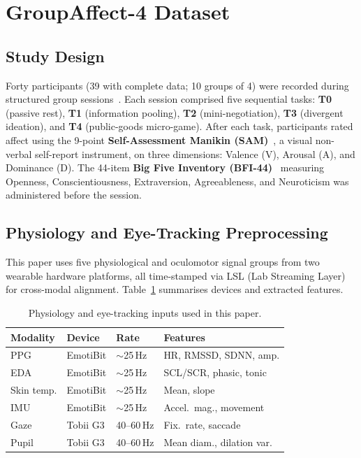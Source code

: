 \documentclass[sigconf,review,anonymous]{acmart}
\begin{document}
\section{GroupAffect-4 Dataset}
\label{sec:dataset}

\subsection{Study Design}
Forty participants (39 with complete data; 10 groups of 4) were recorded
during structured group sessions~\cite{groupaffect4}.
Each session comprised five sequential tasks:
\textbf{T0} (passive rest), \textbf{T1} (information pooling),
\textbf{T2} (mini-negotiation), \textbf{T3} (divergent ideation),
and \textbf{T4} (public-goods micro-game).
After each task, participants rated affect using the 9-point
\textbf{Self-Assessment Manikin (SAM)}~\cite{bradley1994sam}, a visual
non-verbal self-report instrument, on three dimensions: Valence (V),
Arousal (A), and Dominance (D).
The 44-item \textbf{Big Five Inventory (BFI-44)}~\cite{john1999bigfive}
measuring Openness, Conscientiousness, Extraversion, Agreeableness, and
Neuroticism was administered before the session.

\subsection{Physiology and Eye-Tracking Preprocessing}
\label{sec:modpreproc}

This paper uses five physiological and oculomotor signal groups from two
wearable hardware platforms, all time-stamped via LSL (Lab Streaming Layer)
for cross-modal alignment.
Table~\ref{tab:modalities} summarises devices and extracted features.

\begin{table}[t]
\caption{Physiology and eye-tracking inputs used in this paper.}
\label{tab:modalities}
\centering
\setlength{\tabcolsep}{2.5pt}
\small
\begin{tabular}{llll}
\toprule
\textbf{Modality} & \textbf{Device} & \textbf{Rate} & \textbf{Features} \\
\midrule
PPG        & EmotiBit & ${\sim}$25\,Hz & HR, RMSSD, SDNN, amp. \\
EDA        & EmotiBit & ${\sim}$25\,Hz & SCL/SCR, phasic, tonic \\
Skin temp. & EmotiBit & ${\sim}$25\,Hz & Mean, slope \\
IMU        & EmotiBit & ${\sim}$25\,Hz & Accel.\ mag., movement \\
Gaze       & Tobii G3 & 40--60\,Hz & Fix.\ rate, saccade \\
Pupil      & Tobii G3 & 40--60\,Hz & Mean diam., dilation var. \\
\bottomrule
\end{tabular}
\end{table}
\end{document}
